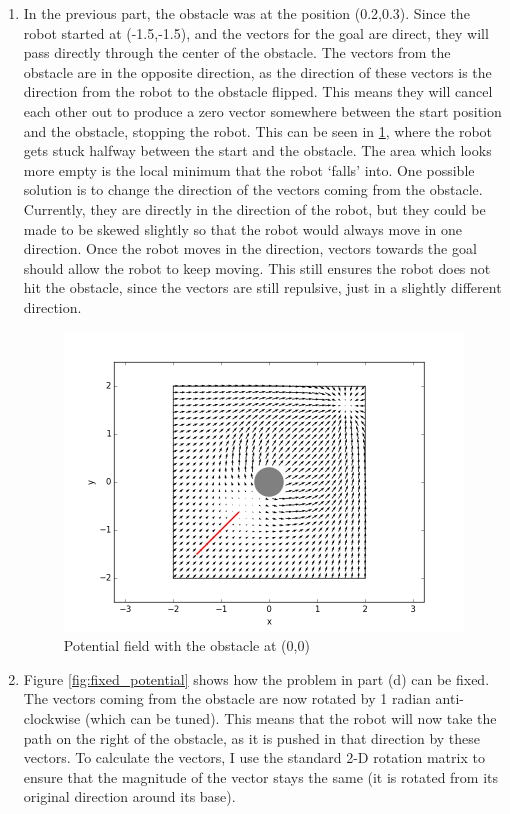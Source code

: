 \documentclass[12pt,a4paper]{article}
\begin{document}
\begin{enumerate}[label=(\alph*)]
	\item In the previous part, the obstacle was at the position (0.2,0.3). Since the robot started at (-1.5,-1.5), and the vectors for the goal are direct, they will pass directly through the center of the obstacle. The vectors from the obstacle are in the opposite direction, as the direction of these vectors is the direction from the robot to the obstacle flipped. This means they will cancel each other out to produce a zero vector somewhere between the start position and the obstacle, stopping the robot. This can be seen in \ref{fig:failed_potential}, where the robot gets stuck halfway between the start and the obstacle. The area which looks more empty is the local minimum that the robot `falls' into. One possible solution is to change the direction of the vectors coming from the obstacle. Currently, they are directly in the direction of the robot, but they could be made to be skewed slightly so that the robot would always move in one direction. Once the robot moves in the direction, vectors towards the goal should allow the robot to keep moving. This still ensures the robot does not hit the obstacle, since the vectors are still repulsive, just in a slightly different direction.
	\begin{figure}[!htb]
		\centering
		\includegraphics[width=12cm]{fig/1d.png}
		\caption{Potential field with the obstacle at (0,0)}
		\label{fig:failed_potential}
	\end{figure}
	\item Figure \ref{fig:fixed_potential} shows how the problem in part (d) can be fixed. The vectors coming from the obstacle are now rotated by 1 radian anti-clockwise (which can be tuned). This means that the robot will now take the path on the right of the obstacle, as it is pushed in that direction by these vectors. To calculate the vectors, I use the standard 2-D rotation matrix to ensure that the magnitude of the vector stays the same (it is rotated from its original direction around its base).

\end{enumerate}
\end{document}
